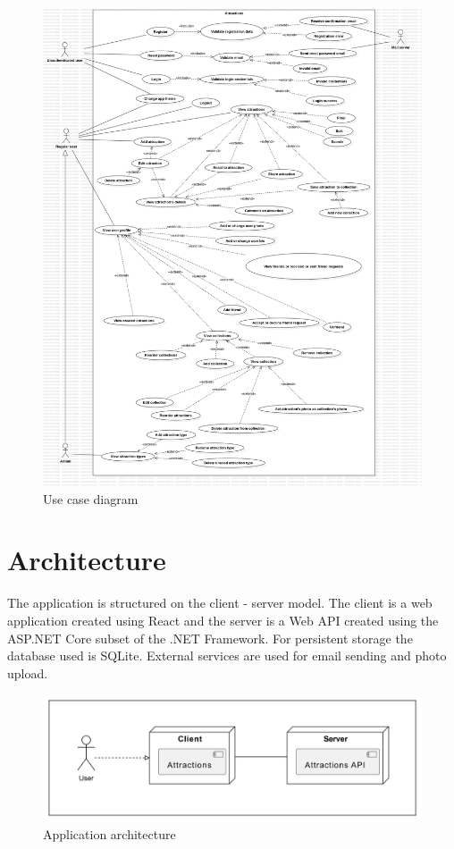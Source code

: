 \begin{figure}[!ht]
    \centering
    \includegraphics[width=1\linewidth]{UseCaseDiagram1.png}
    \caption{Use case diagram}
    \label{fig:enter-label}
\end{figure}

\section{Architecture}

\par The application is structured on the client - server model. The client is a web application created using React and the server is a Web API created using the ASP.NET Core subset of the .NET Framework. For persistent storage the database used is SQLite. External services are used for email sending and photo upload.

\begin{figure}[!ht]
    \centering
    \includegraphics[width=1\linewidth]{app-architecture.png}
    \caption{Application architecture}
    \label{fig:enter-label}
\end{figure}

